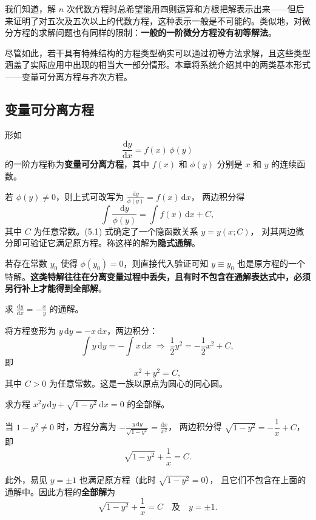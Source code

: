 \documentclass[lang=cn,11pt]{elegantbook}
\begin{document}
我们知道，解 $n$ 次代数方程时总希望能用四则运算和方根把解表示出来——但后来证明了对五次及五次以上的代数方程，这种表示一般是不可能的。类似地，对微分方程的求解问题也有同样的限制：\textbf{一般的一阶微分方程没有初等解法}。

尽管如此，若干具有特殊结构的方程类型确实可以通过初等方法求解，且这些类型涵盖了实际应用中出现的相当大一部分情形。本章将系统介绍其中的两类基本形式——变量可分离方程与齐次方程。

\subsection{变量可分离方程}

\begin{definition}[变量可分离方程] \label{def:separable-ode}
形如
\[
\frac{\mathrm{d}y}{\mathrm{d}x}=f(x)\,\phi(y)
\]
的一阶方程称为\textbf{变量可分离方程}，其中 $f(x)$ 和 $\phi(y)$ 分别是 $x$ 和 $y$
的连续函数。
\end{definition}

若 $\phi(y)\neq 0$，则上式可改写为 $\displaystyle \frac{\mathrm{d}y}{\phi(y)}=f(x)\,\mathrm{d}x$，
两边积分得
\[
\int\frac{\mathrm{d}y}{\phi(y)}=\int f(x)\,\mathrm{d}x + C, \tag{5.1}
\]
其中 $C$ 为任意常数。(5.1) 式确定了一个隐函数关系 $y=y(x;C)$，
对其两边微分即可验证它满足原方程。称这样的解为\textbf{隐式通解}。

\begin{remark}[丢失的特解]
若存在常数 $y_0$ 使得 $\phi(y_0)=0$，则直接代入验证可知 $y\equiv y_0$ 也是原方程的一个特解。\textbf{这类特解往往在分离变量过程中丢失，且有时不包含在通解表达式中，必须另行补上才能得到全部解}。
\end{remark}

\begin{exercise} \label{ex:sep-circle}
求 $\displaystyle\frac{\mathrm{d}y}{\mathrm{d}x}=-\frac{x}{y}$ 的通解。
\end{exercise}
\begin{solution}
将方程变形为 $y\,\mathrm{d}y=-x\,\mathrm{d}x$，两边积分：
\[
\int y\,\mathrm{d}y=-\int x\,\mathrm{d}x
\;\Longrightarrow\;
\frac{1}{2}y^{2}=-\frac{1}{2}x^{2}+C,
\]
即
\[
\boxed{x^{2}+y^{2}=C},
\]
其中 $C>0$ 为任意常数。这是一族以原点为圆心的同心圆。
\end{solution}

\begin{exercise}
求方程 $x^{2}y\,\mathrm{d}y+\sqrt{1-y^{2}}\,\mathrm{d}x=0$ 的全部解。
\end{exercise}
\begin{solution}
当 $1-y^{2}\neq 0$ 时，方程分离为
$\displaystyle -\frac{y\,\mathrm{d}y}{\sqrt{1-y^{2}}}=\frac{\mathrm{d}x}{x^{2}}$，
两边积分得 $\sqrt{1-y^{2}}=-\dfrac{1}{x}+C$，即
\[
\sqrt{1-y^{2}}+\frac{1}{x}=C.
\]

此外，易见 $y=\pm 1$ 也满足原方程（此时 $\sqrt{1-y^2}=0$），
且它们不包含在上面的通解中。因此方程的\textbf{全部解}为
\[
\boxed{\sqrt{1-y^{2}}+\frac{1}{x}=C \quad\text{及}\quad y=\pm 1}.
\]
\end{solution}
\end{document}
